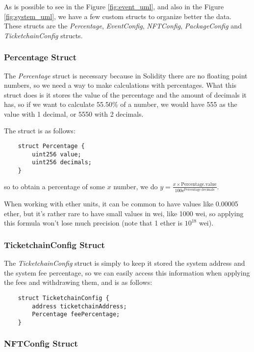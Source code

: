 As is possible to see in the Figure \ref{fig:event_uml}, and also in the Figure \ref{fig:system_uml}, we have a few custom structs to organize better the data. These structs are the \textit{Percentage}, \textit{EventConfig}, \textit{NFTConfig}, \textit{PackageConfig} and \textit{TicketchainConfig} structs.

\subsubsection{Percentage Struct}
\label{subsubsec:percentage_struct}

The \textit{Percentage} struct is necessary because in Solidity there are no floating point numbers, so we need a way to make calculations with percentages. What this struct does is it stores the value of the percentage and the amount of decimals it has, so if we want to calculate 55.50\% of a number, we would have 555 as the value with 1 decimal, or 5550 with 2 decimals.

The struct is as follows:
\begin{verbatim}
    struct Percentage {
        uint256 value;
        uint256 decimals;
    }
\end{verbatim}
so to obtain a percentage of some $x$ number, we do $y = \frac{x \times \text{Percentage.value}}{100\mathrm{e}^\text{Percentage.decimals}}$.

When working with ether units, it can be common to have values like 0.00005 ether, but it's rather rare to have small values in wei, like 1000 wei, so applying this formula won't lose much precision (note that 1 ether is $10^{18}$ wei).

\subsubsection{TicketchainConfig Struct}
\label{subsubsec:ticketchainconfig_struct}

The \textit{TicketchainConfig} struct is simply to keep it stored the system address and the system fee percentage, so we can easily access this information when applying the fees and withdrawing them, and is as follows:
\begin{verbatim}
    struct TicketchainConfig {
        address ticketchainAddress;
        Percentage feePercentage;
    }
\end{verbatim}

\subsubsection{NFTConfig Struct}
\label{subsubsec:nftconfig_struct}

